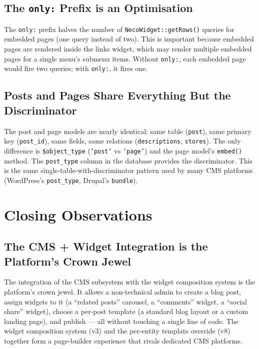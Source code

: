 \documentclass[11pt,a4paper]{article}
\begin{document}
\subsection{The \texttt{only:} Prefix is an Optimisation}

The \texttt{only:} prefix halves the number of
\texttt{NecoWidget::getRows()} queries for embedded pages (one query
instead of two). This is important because embedded pages are rendered
inside the links widget, which may render multiple embedded pages for a
single menu's submenu items. Without \texttt{only:}, each embedded page
would fire two queries; with \texttt{only:}, it fires one.

\subsection{Posts and Pages Share Everything But the Discriminator}

The post and page models are nearly identical: same table
(\texttt{post}), same primary key (\texttt{post\_id}), same fields, same
relations (\texttt{descriptions}, \texttt{stores}). The only difference
is \texttt{\$object\_type} (\texttt{'post'} vs \texttt{'page'}) and the
page model's \texttt{embed()} method. The \texttt{post\_type} column in
the database provides the discriminator. This is the same
single-table-with-discriminator pattern used by many CMS platforms
(WordPress's \texttt{post\_type}, Drupal's \texttt{bundle}).

\section{Closing Observations}\label{sec:observations}

\subsection{The CMS + Widget Integration is the Platform's Crown Jewel}

The integration of the CMS subsystem with the widget composition system
is the platform's crown jewel. It allows a non-technical admin to create
a blog post, assign widgets to it (a ``related posts'' carousel, a
``comments'' widget, a ``social share'' widget), choose a per-post
template (a standard blog layout or a custom landing page), and publish
--- all without touching a single line of code. The widget composition
system (v3) and the per-entity template override (v8) together form a
page-builder experience that rivals dedicated CMS platforms.
\end{document}
